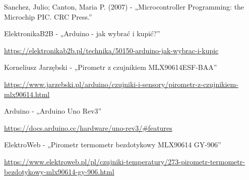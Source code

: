 \cleardoublepage
{}
{}
\begin{thebibliography}{999}
\begin{spacing}{1}

     Sanchez, Julio; Canton, Maria P. (2007) - „Microcontroller Programming: the Microchip PIC. CRC Press.”

     ElektronikaB2B - „Arduino - jak wybrać i kupić?”
    
    \url{https://elektronikab2b.pl/technika/50150-arduino-jak-wybrac-i-kupic}

     Korneliusz Jarzębski - „Pirometr z czujnikiem MLX90614ESF-BAA”

    \url{https://www.jarzebski.pl/arduino/czujniki-i-sensory/pirometr-z-czujnikiem-mlx90614.html}

     Arduino - „Arduino Uno Rev3”

    \url{https://docs.arduino.cc/hardware/uno-rev3/#features}

     ElektroWeb - „Pirometr termometr bezdotykowy MLX90614 GY-906”
    
    \url{https://www.elektroweb.pl/pl/czujniki-temperatury/273-pirometr-termometr-bezdotykowy-mlx90614-gy-906.html}

\end{spacing}
\end{thebibliography}